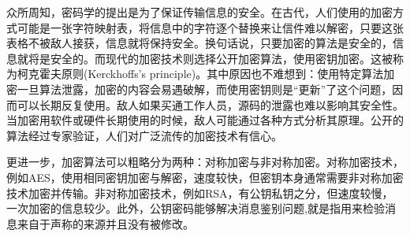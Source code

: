 \documentclass[a4paper]{article}         %
\begin{document}




众所周知，密码学的提出是为了保证传输信息的安全。在古代，人们使用的加密方式可能是一张字符映射表，将信息中的字符逐个替换来让信件难以解密，只要这张表格不被敌人接获，信息就将保持安全。换句话说，只要加密的算法是安全的，信息就将是安全的。而现代的加密技术则选择公开加密算法，使用密钥加密。这被称为柯克霍夫原则(Kerckhoffs's principle)。其中原因也不难想到：使用特定算法加密一旦算法泄露，加密的内容会易遇破解，而使用密钥则是“更新”了这个问题，因而可以长期反复使用。敌人如果买通工作人员，源码的泄露也难以影响其安全性。当加密用软件或硬件长期使用的时候，敌人可能通过各种方式分析其原理。公开的算法经过专家验证，人们对广泛流传的加密技术有信心。

更进一步，加密算法可以粗略分为两种：对称加密与非对称加密。对称加密技术，例如AES，使用相同密钥加密与解密，速度较快，但密钥本身通常需要非对称加密技术加密并传输。非对称加密技术，例如RSA，有公钥私钥之分，但速度较慢，一次加密的信息较少。此外，公钥密码能够解决消息鉴别问题,就是指用来检验消息来自于声称的来源并且没有被修改。
\end{document}

